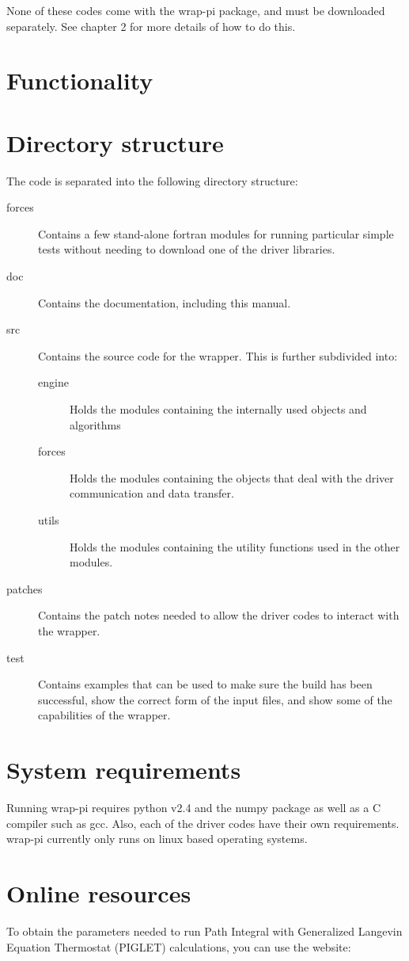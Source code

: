 \documentclass[12pt,fleqn]{report}
\begin{document}
None of these codes come with the wrap-pi package, and must be downloaded 
separately. See chapter 2 for more details of how to do this. 
\section{Functionality}
\section{Directory structure}
The code is separated into the following directory structure:
\begin{description}
\item[forces] Contains a few stand-alone fortran modules for running particular simple tests without needing to download one of the driver libraries.
\item[doc] Contains the documentation, including this manual.
\item[src] Contains the source code for the wrapper. This is further 
subdivided into:
\begin{description}
\item[engine] Holds the modules containing the internally used objects and 
algorithms
\item[forces] Holds the modules containing the objects that deal with the 
driver communication and data transfer.
\item[utils] Holds the modules containing the utility functions used in the 
other modules.
\end{description}
\item[patches] Contains the patch notes needed to allow the driver codes to 
interact with the wrapper.
\item[test] Contains examples that can be used to make sure the build has been
successful, show the correct form of the input files, and show some of the 
capabilities of the wrapper.
\end{description}
\section{System requirements}
Running wrap-pi requires python v2.4 and the numpy package as well as a C 
compiler such as gcc. Also, each of the driver codes have their own 
requirements. wrap-pi currently only runs on linux based operating systems. 
\section{Online resources}
To obtain the parameters needed to run Path Integral with Generalized 
Langevin Equation Thermostat (PIGLET) calculations, you can use the website:
\end{document}
